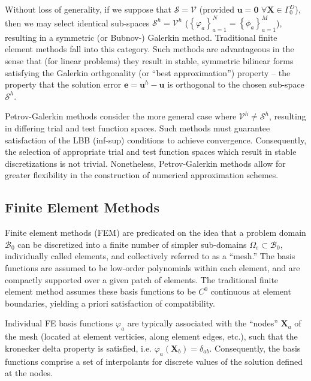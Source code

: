 Without loss of generality, if we suppose that $\mathcal{S} = \mathcal{V}$ (provided $\mathbf{u} = \mathbf{0} \, \, \forall \mathbf{X} \in \Gamma^D_0$), then we may select identical sub-spaces $\mathcal{S}^h = \mathcal{V}^h$ ($\left\{ \varphi_a \right\}_{a = 1}^{N} = \left\{ \phi_a \right\}_{a = 1}^{M}$), resulting in a symmetric (or Bubnov-) Galerkin method. Traditional finite element methods fall into this category. Such methods are advantageous in the sense that (for linear problems) they result in stable, symmetric bilinear forms satisfying the Galerkin orthgonality (or ``best approximation'') property -- the property that the solution error $\mathbf{e} = \mathbf{u}^h - \mathbf{u}$ is orthogonal to the chosen sub-space $\mathcal{S}^h$.

Petrov-Galerkin methods consider the more general case where $\mathcal{V}^h \neq \mathcal{S}^h$, resulting in differing trial and test function spaces. Such methods must guarantee satisfaction of the LBB (inf-sup) conditions to achieve convergence. Consequently, the selection of appropriate trial and test function spaces which result in stable discretizations is not trivial. Nonetheless, Petrov-Galerkin methods allow for greater flexibility in the construction of numerical approximation schemes.

\subsection*{Finite Element Methods}

Finite element methods (FEM) are predicated on the idea that a problem domain $\mathcal{B}_0$ can be discretized into a finite number of simpler sub-domains $\Omega_e \subset \mathcal{B}_0$, individually called elements, and collectively referred to as a ``mesh.'' The basis functions are assumed to be low-order polynomials within each element, and are compactly supported over a given patch of elements. The traditional finite element method assumes these basis functions to be $C^0$ continuous at element boundaries, yielding a priori satisfaction of compatibility.

Individual FE basis functions $\varphi_a$ are typically associated with the ``nodes'' $\mathbf{X}_a$ of the mesh (located at element verticies, along element edges, etc.), such that the kronecker delta property is satisfied, i.e. $\varphi_a (\mathbf{X}_b) = \delta_{ab}$. Consequently, the basis functions comprise a set of interpolants for discrete values of the solution defined at the nodes.

